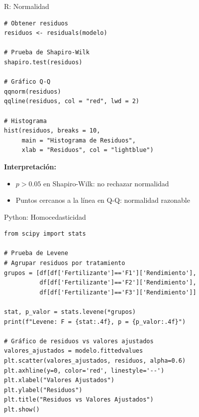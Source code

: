 \documentclass[aspectratio=169]{beamer}
\begin{document}
\begin{frame}[fragile]{R: Normalidad}
\small
\begin{verbatim}
# Obtener residuos
residuos <- residuals(modelo)

# Prueba de Shapiro-Wilk
shapiro.test(residuos)

# Gráfico Q-Q
qqnorm(residuos)
qqline(residuos, col = "red", lwd = 2)

# Histograma
hist(residuos, breaks = 10,
     main = "Histograma de Residuos",
     xlab = "Residuos", col = "lightblue")
\end{verbatim}

\vspace{0.2cm}
\textbf{Interpretación:}
\begin{itemize}
\item $p > 0.05$ en Shapiro-Wilk: no rechazar normalidad
\item Puntos cercanos a la línea en Q-Q: normalidad razonable
\end{itemize}
\end{frame}

\begin{frame}[fragile]{Python: Homocedasticidad}
\small
\begin{verbatim}
from scipy import stats

# Prueba de Levene
# Agrupar residuos por tratamiento
grupos = [df[df['Fertilizante']=='F1']['Rendimiento'],
          df[df['Fertilizante']=='F2']['Rendimiento'],
          df[df['Fertilizante']=='F3']['Rendimiento']]

stat, p_valor = stats.levene(*grupos)
print(f"Levene: F = {stat:.4f}, p = {p_valor:.4f}")

# Gráfico de residuos vs valores ajustados
valores_ajustados = modelo.fittedvalues
plt.scatter(valores_ajustados, residuos, alpha=0.6)
plt.axhline(y=0, color='red', linestyle='--')
plt.xlabel("Valores Ajustados")
plt.ylabel("Residuos")
plt.title("Residuos vs Valores Ajustados")
plt.show()
\end{verbatim}
\end{frame}
\end{document}
